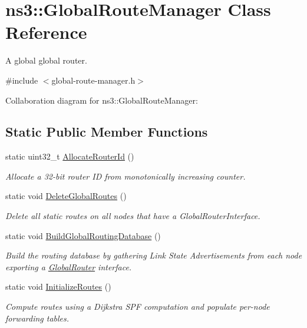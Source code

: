 \hypertarget{classns3_1_1GlobalRouteManager}{}\section{ns3\+:\+:Global\+Route\+Manager Class Reference}
\label{classns3_1_1GlobalRouteManager}


A global global router.  




{\ttfamily \#include $<$global-\/route-\/manager.\+h$>$}



Collaboration diagram for ns3\+:\+:Global\+Route\+Manager\+:
\subsection*{Static Public Member Functions}
\begin{DoxyCompactItemize}
\item 
static uint32\+\_\+t \hyperlink{classns3_1_1GlobalRouteManager_a7d2bab784e14064823d4115d65e949b7}{Allocate\+Router\+Id} ()
\begin{DoxyCompactList}\small\item\em Allocate a 32-\/bit router ID from monotonically increasing counter. \end{DoxyCompactList}\item 
static void \hyperlink{classns3_1_1GlobalRouteManager_a046807276556c567868fca992895b695}{Delete\+Global\+Routes} ()
\begin{DoxyCompactList}\small\item\em Delete all static routes on all nodes that have a Global\+Router\+Interface. \end{DoxyCompactList}\item 
static void \hyperlink{classns3_1_1GlobalRouteManager_af0d9e010837cc915d430b17f63175910}{Build\+Global\+Routing\+Database} ()
\begin{DoxyCompactList}\small\item\em Build the routing database by gathering Link State Advertisements from each node exporting a \hyperlink{classns3_1_1GlobalRouter}{Global\+Router} interface. \end{DoxyCompactList}\item 
static void \hyperlink{classns3_1_1GlobalRouteManager_aea21f6fb4dbecb0d2e3dadc7db1087d3}{Initialize\+Routes} ()
\begin{DoxyCompactList}\small\item\em Compute routes using a Dijkstra S\+PF computation and populate per-\/node forwarding tables. \end{DoxyCompactList}\end{DoxyCompactItemize}
